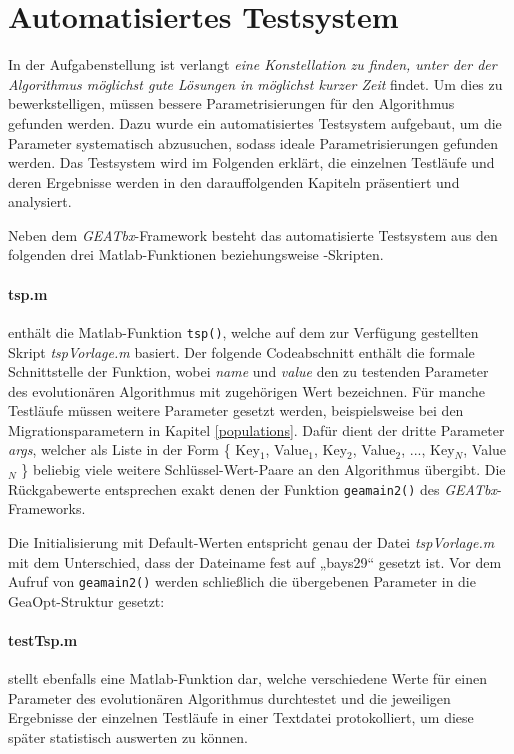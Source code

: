 \section{Automatisiertes Testsystem}\label{testsystem}

In der Aufgabenstellung \citep{aufg} ist verlangt \emph{eine Konstellation zu finden,
unter der der Algorithmus möglichst gute Lösungen in möglichst kurzer Zeit} findet.
Um dies zu bewerkstelligen, müssen bessere Parametrisierungen für den Algorithmus
gefunden werden. Dazu wurde ein automatisiertes Testsystem aufgebaut, um
die Parameter systematisch abzusuchen, sodass ideale Parametrisierungen
gefunden werden. Das Testsystem wird im Folgenden erklärt, die einzelnen Testläufe
und deren Ergebnisse werden in den darauffolgenden Kapiteln präsentiert und
analysiert.

Neben dem \emph{GEATbx}-Framework besteht das automatisierte Testsystem aus den
folgenden drei Matlab-Funktionen beziehungsweise -Skripten.


\paragraph{tsp.m} enthält die Matlab-Funktion {\tt tsp()}, welche auf dem
zur Verfügung gestellten Skript \emph{tspVorlage.m} basiert. Der folgende
Codeabschnitt enthält die formale Schnittstelle der Funktion, wobei \emph{name}
und \emph{value} den zu testenden Parameter des evolutionären Algorithmus mit
zugehörigen Wert bezeichnen.
Für manche Testläufe müssen weitere Parameter gesetzt werden, beispielsweise
bei den Migrationsparametern in Kapitel \ref{populations}. Dafür dient der
dritte Parameter \emph{args}, welcher als Liste in der Form
\{ Key$_{1}$, Value$_{1}$, Key$_{2}$, Value$_{2}$, ..., Key$_{N}$, Value$_{N}$ \}
beliebig viele weitere Schlüssel-Wert-Paare an den Algorithmus übergibt.
Die Rückgabewerte entsprechen exakt denen der Funktion {\tt geamain2()} des
\emph{GEATbx}-Frameworks.



\noindent Die Initialisierung mit Default-Werten entspricht genau der Datei
\emph{tspVorlage.m} mit dem Unterschied, dass der Dateiname fest auf „bays29“
gesetzt ist. Vor dem Aufruf von {\tt geamain2()} werden schließlich die
übergebenen Parameter in die GeaOpt-Struktur gesetzt:



\paragraph{testTsp.m} stellt ebenfalls eine Matlab-Funktion dar, welche
verschiedene Werte für einen Parameter des evolutionären Algorithmus durchtestet
und die jeweiligen Ergebnisse der einzelnen Testläufe in einer Textdatei
protokolliert, um diese später statistisch auswerten zu können.

